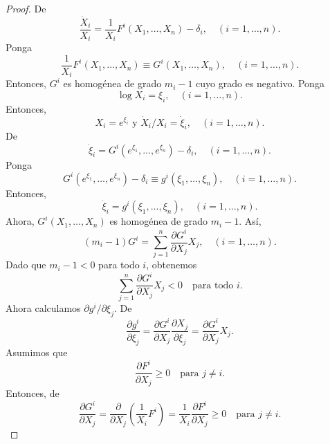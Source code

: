 \begin{proof}
	De %
	\begin{equation}
	\frac{\dot{X}_{i}}{X_{i}}=\frac{1}{X_{i}}F^{i}\left(X_{1},\ldots,X_{n}\right)-\delta_{i},\quad\left(i=1,\ldots,n\right).
	\end{equation}
	Ponga
	\begin{equation}
	\frac{1}{X_{i}}F^{i}\left(X_{1},\ldots,X_{n}\right)\equiv G^{i}\left(X_{1},\ldots,X_{n}\right),\quad\left(i=1,\ldots,n\right).
	\end{equation}
	Entonces, $G^{i}$ es homogénea de grado $m_{i}-1$ cuyo grado es negativo. Ponga
	\begin{equation}
	\log X_{i}=\xi_{i},\quad\left(i=1,\ldots,n\right).
	\end{equation}
	Entonces, \[ X_{i}=e^{\xi_{i}}\text{ y }\dot{X}_{i}/X_{i}=\dot{\xi}_{i},\quad\left(i=1,\ldots,n\right). \] De %
	\[ \dot{\xi}_{i}=G^{i}\left(e^{\xi_{1}},\ldots,e^{\xi_{n}}\right)-\delta_{i},\quad\left(i=1,\ldots,n\right). \] Ponga
	\begin{equation}
	G^{i}\left(e^{\xi_{1}},\ldots,e^{\xi_{n}}\right)-\delta_{i}\equiv g^{i}\left(\xi_{1},\ldots,\xi_{n}\right),\quad\left(i=1,\ldots,n\right).
	\end{equation}
	Entonces,
	\begin{equation}
	\dot{\xi}_{i}=g^{i}\left(\xi_{1},\ldots,\xi_{n}\right),\quad\left(i=1,\ldots,n\right).
	\end{equation}
	Ahora, $G^{i}\left(X_{1},\ldots,X_{n}\right)$ es homogénea de grado $m_{i}-1$. Así, \[ \left(m_{i}-1\right)G^{i}=\sum_{j=1}^{n}\frac{\partial G^{i}}{\partial X_{j}}X_{j},\quad\left(i=1,\ldots,n\right). \] Dado que $m_{i}-1<0$ para todo $i$, obtenemos
	\begin{equation}
	\sum_{j=1}^{n}\frac{\partial G^{i}}{\partial X_{j}}X_{j}<0\quad\text{para todo }i.
	\end{equation}
	Ahora calculamos $\partial g^{i}/\partial\xi_{j}$. De %
	\begin{equation}
	\frac{\partial g^{i}}{\partial\xi_{j}}=\frac{\partial G^{i}}{\partial X_{j}}\frac{\partial X_{j}}{\partial\xi_{j}}=\frac{\partial G^{i}}{\partial X_{j}}X_{j}.
	\end{equation}
	Asumimos que \[ \frac{\partial F^{i}}{\partial X_{j}}\geq0\quad\text{para }j\neq i. \] Entonces, de %
	\begin{equation}
	\frac{\partial G^{i}}{\partial X_{j}}=\frac{\partial}{\partial X_{j}}\left(\frac{1}{X_{i}}F^{i}\right)=\frac{1}{X_{i}}\frac{\partial F^{i}}{\partial X_{j}}\geq0\quad\text{para }j\neq i.

\end{equation}
\end{proof}
